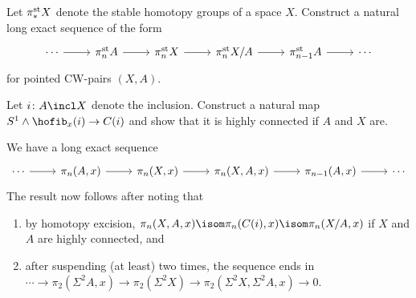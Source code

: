 \begin{exercise}
	Let $\pi^{\mathrm{st}}_* X$ denote the stable homotopy groups of a space $X$.
	Construct a natural long exact sequence of the form 
	\begin{equation*}
		\begin{tikzcd}
			\cdots
					\ar[r]
				& \pis_n A
					\ar[r]
				& \pis_n X
					\ar[r]
				& \pis_n X / A
					\ar[r]
				& \pis_{n - 1} A
					\ar[r]
				& \cdots
		\end{tikzcd}
	\end{equation*}
	for pointed CW-pairs $(X, A)$.
	\begin{hint}
		Let $i\colon A \incl X$ denote the inclusion.
		Construct a natural map $S^1 \wedge \hofib_x(i) \to C(i)$ and show that it is highly connected if $A$ and $X$ are.
	\end{hint}
\end{exercise}
\begin{solution}
	We have a long exact sequence
	\begin{equation*}
		\begin{tikzcd}
			\cdots
					\ar[r]
				& \pi_n(A, x)
					\ar[r]
				& \pi_n(X, x)
					\ar[r]
				& \pi_n(X, A, x)
					\ar[r]
				& \pi_{n - 1}(A, x)
					\ar[r]
				& \cdots
		\end{tikzcd}
	\end{equation*}
	The result now follows after noting that
	\begin{enumerate}
		\item by homotopy excision, $\pi_n(X, A, x) \isom \pi_n(C(i), x) \isom \pi_n(X / A, x)$ if $X$ and $A$ are highly connected, and
		\item after suspending (at least) two times, the sequence ends in $\cdots \to \pi_2(\Sigma^2 A, x) \to \pi_2(\Sigma^2 X) \to \pi_2(\Sigma^2 X, \Sigma^2 A, x) \to 0$.
			\qedhere
	\end{enumerate}
\end{solution}

